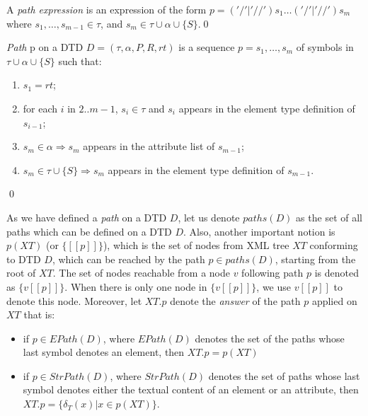 \begin{define}
A {\sl path expression} is an expression of the form $p = ('/' | '//')s_1 \dots ('/'|'//')s_m$ where $s_1, \dots, s_{m-1} \in \tau$, and $s_m \in \tau \cup \alpha \cup \{S\}$.\qed
\end{define}

\begin{define}[Path]
{\sl Path} p on a DTD $D = (\tau, \alpha, P, R, rt)$ is a sequence $p = s_1, \dots, s_m$ of symbols in $\tau \cup \alpha \cup \{S\}$ such that:
\renewcommand{\labelenumi}{\roman{enumi})}
	\begin{enumerate}
		\item $s_1=rt$;
		\item for each $i$ in $2..m-1$, $s_i \in \tau$ and $s_i$ appears in the element type definition of $s_{i-1}$;
		\item $s_m \in \alpha \Rightarrow s_m$ appears in the attribute list of $s_{m-1}$;
		\item $s_m \in \tau \cup \{S\} \Rightarrow s_m$ appears in the element type definition of $s_{m-1}$.
	\end{enumerate}\qed
\end{define}

As we have defined a \emph{path} on a DTD $D$, let us denote $paths(D)$ as the set of all paths which can be defined on a DTD $D$. Also, another important notion is $p(XT)$ (or $\{[\![p]\!]\}$), which is the set of nodes from XML tree $XT$ conforming to DTD $D$, which can be reached by the path $p \in paths(D)$, starting from the root of $XT$. The set of nodes reachable from a node $v$ following path $p$ is denoted as $\{v[\![p]\!]\}$. When there is only one node in $\{v[\![p]\!]\}$, we use $v[\![p]\!]$ to denote this node. Moreover, let $XT.p$ denote the \emph{answer} of the path $p$ applied on $XT$ that is:
\begin{itemize}
	\item if $p \in EPath(D)$, where $EPath(D)$ denotes the set of the paths whose last symbol denotes an element, then $XT.p = p(XT)$
	\item if $p \in StrPath(D)$, where $StrPath(D)$ denotes the set of paths whose last symbol denotes either the textual content of an element or an
attribute, then $XT.p = \{\delta_T(x)|x \in p(XT)\}$.
\end{itemize}


